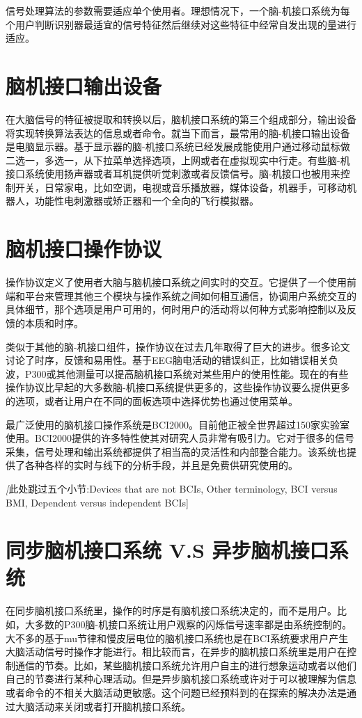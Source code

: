 信号处理算法的参数需要适应单个使用者。理想情况下，一个脑-机接口系统为每个用户判断识别器最适宜的信号特征然后继续对这些特征中经常自发出现的量进行适应。

\section*{脑机接口输出设备}
在大脑信号的特征被提取和转换以后，脑机接口系统的第三个组成部分，输出设备将实现转换算法表达的信息或者命令。就当下而言，最常用的脑-机接口输出设备是电脑显示器。基于显示器的脑-机接口系统已经发展成能使用户通过移动鼠标做二选一，多选一，从下拉菜单选择选项，上网或者在虚拟现实中行走。有些脑-机接口系统使用扬声器或者耳机提供听觉刺激或者反馈信号。脑-机接口也被用来控制开关，日常家电，比如空调，电视或音乐播放器，媒体设备，机器手，可移动机器人，功能性电刺激器或矫正器和一个全向的飞行模拟器。

\section*{脑机接口操作协议}
操作协议定义了使用者大脑与脑机接口系统之间实时的交互。它提供了一个使用前端和平台来管理其他三个模块与操作系统之间如何相互通信，协调用户系统交互的具体细节，那个选项是用户可用的，何时用户的活动将以何种方式影响控制以及反馈的本质和时序。

类似于其他的脑-机接口组件，操作协议在过去几年取得了巨大的进步。很多论文讨论了时序，反馈和易用性。基于EEG脑电活动的错误纠正，比如错误相关负波，P300或其他测量可以提高脑机接口系统对某些用户的使用性能。现在的有些操作协议比早起的大多数脑-机接口系统提供更多的，这些操作协议要么提供更多的选项，或者让用户在不同的面板选项中选择优势也通过使用菜单。

最广泛使用的脑机接口操作系统是BCI2000。目前他正被全世界超过150家实验室使用。BCI2000提供的许多特性使其对研究人员非常有吸引力。它对于很多的信号采集，信号处理和输出系统都提供了相当高的灵活性和内部整合能力。该系统也提供了各种各样的实时与线下的分析手段，并且是免费供研究使用的。

\textit[此处跳过五个小节:Devices that are not BCIs, Other terminology, BCI versus BMI, Dependent versus independent BCIs]

\section*{同步脑机接口系统 V.S 异步脑机接口系统}
在同步脑机接口系统里，操作的时序是有脑机接口系统决定的，而不是用户。比如，大多数的P300脑-机接口系统让用户观察的闪烁信号速率都是由系统控制的。大不多的基于mu节律和慢皮层电位的脑机接口系统也是在BCI系统要求用户产生大脑活动信号时操作才能进行。相比较而言，在异步的脑机接口系统里是用户在控制通信的节奏。比如，某些脑机接口系统允许用户自主的进行想象运动或者以他们自己的节奏进行某种心理活动。但是异步脑机接口系统或许对于可以被理解为信息或者命令的不相关大脑活动更敏感。这个问题已经预料到的在探索的解决办法是通过大脑活动来关闭或者打开脑机接口系统。

